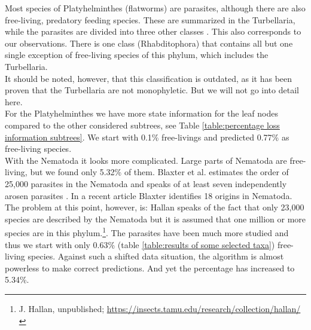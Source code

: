       Most species of Platyhelminthes (flatworms) are parasites, although there are also free-living, 
        predatory feeding species. These are summarized in the Turbellaria, while the parasites are 
        divided into three other classes \cite{Ax1961}. This also corresponds to our observations. There 
        is one class (Rhabditophora) that contains all but one single exception of free-living species 
        of this phylum, which includes the Turbellaria. \\
      It should be noted, however, that this classification is outdated, as it has been proven that 
        the Turbellaria are not monophyletic. But we will not go into detail here. \\
      For the Platyhelminthes we have more state information for the leaf nodes compared to the other 
        considered subtrees, see Table \ref{table:percentage loss information subtrees}. We start with 
        0.1\% free-livings and predicted 0.77\% as free-living species. \\

      With the Nematoda it looks more complicated. Large parts of Nematoda are free-living, but we 
        found only 5.32\% of them. Blaxter et al. estimates the order of 25,000 parasites in the 
        Nematoda \cite{Blaxter2015} and speaks of at least seven independently arosen parasites 
        \cite{Blaxter1998}. In a recent article Blaxter identifies 18 origins \cite{Blaxter2015} in 
        Nematoda. \\
      The problem at this point, however, is: Hallan speaks of the fact that only 23,000 species 
        are described by the Nematoda but it is assumed that one million or more species are in this 
        phylum.\footnote{J. Hallan, unpublished; 
          \hyperlink{https://insects.tamu.edu/research/collection/hallan/}
          {https://insects.tamu.edu/research/collection/hallan/}
        }.  The parasites have been much more studied and thus we start 
        with only 0.63\% (table \ref{table:results of some selected taxa}) free-living species. Against such 
        a shifted data situation, the algorithm is almost powerless to make correct predictions. And yet 
        the percentage has increased to 5.34\%. \\


